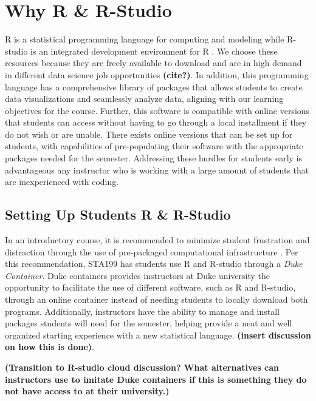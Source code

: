 \documentclass[
  12pt]{article}
\begin{document}
\hypertarget{why-r-r-studio}{%
\section{Why R \& R-Studio}\label{why-r-r-studio}}

R is a statistical programming language for computing and modeling while
R-studio is an integrated development environment for R \citep{Rcite}.
We choose these resources because they are freely available to download
and are in high demand in different data science job opportunities
\textbf{(cite?)}. In addition, this programming language has a
comprehensive library of packages that allows students to create data
visualizations and seamlessly analyze data, aligning with our learning
objectives for the course. Further, this software is compatible with
online versions that students can access without having to go through a
local installment if they do not wish or are unable. There exists online
versions that can be set up for students, with capabilities of
pre-populating their software with the appropriate packages needed for
the semester. Addressing these hurdles for students early is
advantageous any instructor who is working with a large amount of
students that are inexperienced with coding.

\hypertarget{setting-up-students-r-r-studio}{%
\subsection{Setting Up Students R \&
R-Studio}\label{setting-up-students-r-r-studio}}

In an introductory course, it is recommended to minimize student
frustration and distraction through the use of pre-packaged
computational infrastructure \citep{Rundel2018}. Per this
recommendation, STA199 has students use R and R-studio through a
\emph{Duke Container}. Duke containers provides instructors at Duke
university the opportunity to facilitate the use of different software,
such as R and R-studio, through an online container instead of needing
students to locally download both programs. Additionally, instructors
have the ability to manage and install packages students will need for
the semester, helping provide a neat and well organized starting
experience with a new statistical language. \textbf{(insert discussion
on how this is done)}.

\textbf{(Transition to R-studio cloud discussion? What alternatives can
instructors use to imitate Duke containers if this is something they do
not have access to at their university.)}
\end{document}
